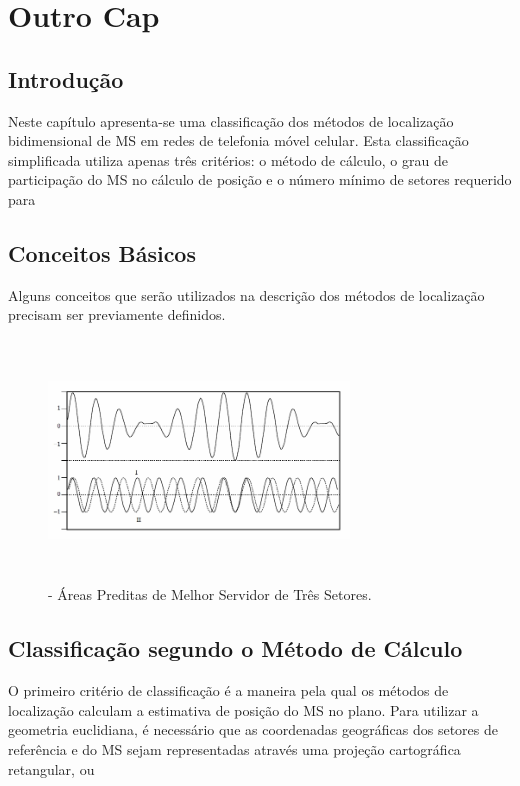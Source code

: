 \chapter{Outro Cap}
\label{chapter:cap4}

\section{\textbf{Introdução}}
Neste capítulo apresenta-se uma classificação dos métodos de localização bidimensional de MS em redes de telefonia móvel celular. Esta classificação simplificada utiliza apenas três critérios: o método de cálculo, o grau de participação do MS no cálculo de posição e o número mínimo de setores requerido para 

\section{\textbf{Conceitos Básicos}}
\label{sec:Cap1Conceitos}

Alguns conceitos que serão utilizados na descrição dos métodos de localização precisam ser previamente definidos.


\begin{figure}[H]
\begin{center}
\includegraphics[width=8cm,height=6.4cm]{./01_Cap1/figures/fig_06_br.png}
\caption{\label{fig:bestserverarea}- Áreas Preditas de Melhor Servidor de Três Setores.}
\end{center}
\end{figure}

\section{\textbf{Classificação segundo o Método de Cálculo}}
\label{sec:Cap1Metodo}

O primeiro critério de classificação é a maneira pela qual os métodos de localização calculam a estimativa de posição do MS no plano. Para utilizar a geometria euclidiana, é necessário que as coordenadas geográficas dos setores de referência e do MS sejam representadas através uma projeção cartográfica retangular, ou 

